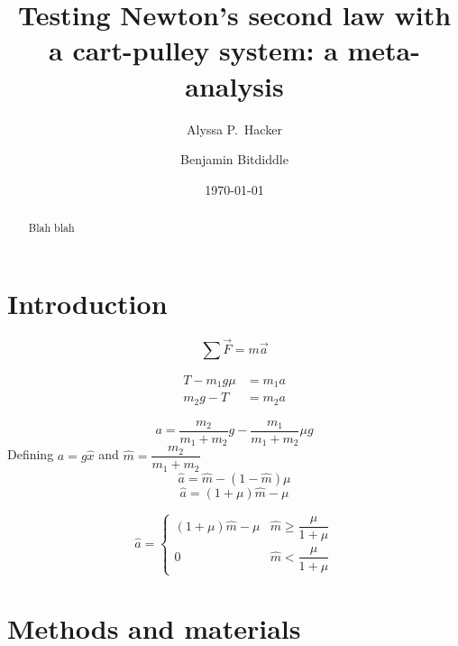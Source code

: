 \documentclass[reprint,amsmath,amssymb,aps,twoside]{revtex4-2}
\begin{document}
\setcounter{page}{1}
\title{Testing Newton's second law with a cart-pulley system: a meta-analysis}

\author{Alyssa P.~Hacker}
\author{Benjamin Bitdiddle}
\date{\today}

\begin{abstract}
Blah blah
\end{abstract}


\maketitle\thispagestyle{mytitlepage}





\section{Introduction}
\begin{equation}
\sum\vec{F} = m\vec{a}
\end{equation}

\begin{align}
T - m_1 g \mu &= m_1 a \\
m_2 g - T &= m_2 a 
\end{align}

\begin{equation}
a = \dfrac{m_2}{m_1+m_2} g - \dfrac{m_1}{m_1+m_2} \mu g
\end{equation}
Defining $a = g \hat{x}$ and $\hat{m} = \dfrac{m_2}{m_1+m_2}$
\begin{equation}
\hat{a} = \hat{m} - (1-\hat{m}) \mu
\end{equation}
\begin{equation}
\hat{a} = (1+\mu) \hat{m} - \mu
\end{equation}

\begin{equation}
\hat{a} = 
\begin{cases}
(1+\mu) \hat{m} - \mu & \hat{m} \geq \dfrac{\mu}{1+\mu} \\
0 & \hat{m} < \dfrac{\mu}{1+\mu} 
\end{cases}
\end{equation}

\section{Methods and materials}
\cite{R-2024,ggplot2-2024}
\end{document}
